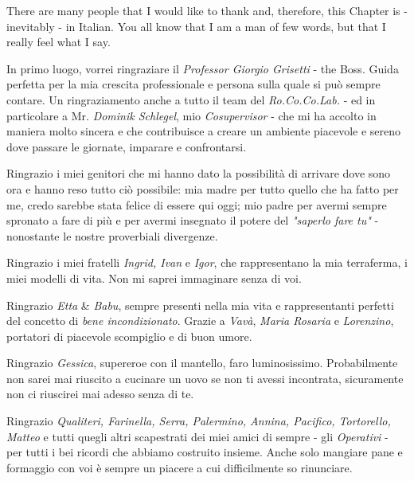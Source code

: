 \newpage

\begin{acknowledgements}
    There are many people that I would like to thank and, therefore, this Chapter is - inevitably - in Italian. You all know that I am a man of few words, but that I really feel what I say.
    
    \vspace{15px}
    
    In primo luogo, vorrei ringraziare il \textit{Professor Giorgio Grisetti} - the Boss. Guida perfetta per la mia crescita professionale e persona sulla quale si può sempre contare. Un ringraziamento anche a tutto il team del \textit{Ro.Co.Co.Lab.} - ed in particolare a Mr. \textit{Dominik Schlegel}, mio \textit{Cosupervisor} - che mi ha accolto in maniera molto sincera e che contribuisce a creare un ambiente piacevole e sereno dove passare le giornate, imparare e confrontarsi.
    
    Ringrazio i miei genitori che mi hanno dato la possibilità di arrivare dove sono ora e hanno reso tutto ciò possibile: mia madre per tutto quello che ha fatto per me, credo sarebbe stata felice di essere qui oggi; mio padre per avermi sempre spronato a fare di più e per avermi insegnato il potere del \textit{"saperlo fare tu"} - nonostante le nostre proverbiali divergenze.
    
    Ringrazio i miei fratelli \textit{Ingrid, Ivan} e \textit{Igor}, che rappresentano la mia terraferma, i miei modelli di vita. Non mi saprei immaginare senza di voi.
    
    Ringrazio \textit{Etta} \& \textit{Babu}, sempre presenti nella mia vita e rappresentanti perfetti del concetto di \textit{bene incondizionato}. Grazie a \textit{Vavà}, \textit{Maria Rosaria} e \textit{Lorenzino}, portatori di piacevole scompiglio e di buon umore. 
    
    Ringrazio \textit{Gessica}, supereroe con il mantello, faro luminosissimo. Probabilmente non sarei mai riuscito a cucinare un uovo se non ti avessi incontrata, sicuramente non ci riuscirei mai adesso senza di te.
    
    Ringrazio \textit{Qualiteri, Farinella, Serra, Palermino, Annina, Pacifico, Tortorello, Matteo} e tutti quegli altri scapestrati dei miei amici di sempre - gli \textit{Operativi}\textsuperscript{\texttrademark} - per tutti i bei ricordi che abbiamo costruito insieme. Anche solo mangiare pane e formaggio con voi è sempre un piacere a cui difficilmente so rinunciare. 
    

\end{acknowledgements}
